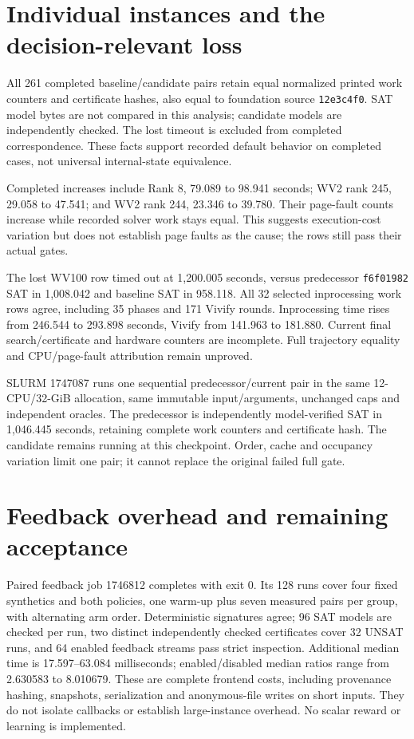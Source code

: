 \documentclass[11pt]{article}
\begin{document}
\section*{Individual instances and the decision-relevant loss}
All 261 completed baseline/candidate pairs retain equal normalized printed
work counters and certificate hashes, also equal to foundation source
\texttt{12e3c4f0}. SAT model bytes are not compared in this analysis; candidate
models are independently checked. The lost timeout is excluded from completed
correspondence. These facts support recorded default behavior on completed
cases, not universal internal-state equivalence.

Completed increases include Rank 8, 79.089 to 98.941 seconds; WV2 rank 245,
29.058 to 47.541; and WV2 rank 244, 23.346 to 39.780. Their page-fault counts
increase while recorded solver work stays equal. This suggests execution-cost
variation but does not establish page faults as the cause; the rows still pass
their actual gates.

The lost WV100 row timed out at 1,200.005 seconds, versus predecessor
\texttt{f6f01982} SAT in 1,008.042 and baseline SAT in 958.118. All 32 selected
inprocessing work rows agree, including 35 phases and 171 Vivify rounds.
Inprocessing time rises from 246.544 to 293.898 seconds, Vivify from 141.963
to 181.880. Current final search/certificate and hardware counters are
incomplete. Full trajectory equality and CPU/page-fault attribution remain
unproved.

SLURM 1747087 runs one sequential predecessor/current pair in the same
12-CPU/32-GiB allocation, same immutable input/arguments, unchanged caps and
independent oracles. The predecessor is independently model-verified SAT in
1,046.445 seconds, retaining complete work counters and certificate hash.
The candidate remains running at this checkpoint. Order, cache and occupancy
variation limit one pair; it cannot replace the original failed full gate.

\section*{Feedback overhead and remaining acceptance}
Paired feedback job 1746812 completes with exit 0. Its 128 runs cover four fixed
synthetics and both policies, one warm-up plus seven measured pairs per group,
with alternating arm order. Deterministic signatures agree; 96 SAT models are
checked per run, two distinct independently checked certificates cover 32
UNSAT runs, and 64 enabled feedback streams pass strict inspection.
Additional median time is 17.597--63.084 milliseconds; enabled/disabled median
ratios range from 2.630583 to 8.010679. These are complete frontend costs,
including provenance hashing, snapshots, serialization and anonymous-file
writes on short inputs. They do not isolate callbacks or establish
large-instance overhead. No scalar reward or learning is implemented.
\end{document}
